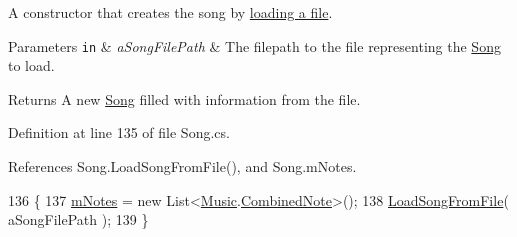 A constructor that creates the song by \hyperlink{group___song_priv_func_ga5c8edd8f7ebeab0d93f5619a644c30f5}{loading a file}. 


\begin{DoxyParams}[1]{Parameters}
\mbox{\tt in}  & {\em a\+Song\+File\+Path} & The filepath to the file representing the \hyperlink{class_song}{Song} to load. \\
\hline
\end{DoxyParams}
\begin{DoxyReturn}{Returns}
A new \hyperlink{class_song}{Song} filled with information from the file. 
\end{DoxyReturn}


Definition at line 135 of file Song.\+cs.



References Song.\+Load\+Song\+From\+File(), and Song.\+m\+Notes.


\begin{DoxyCode}
136     \{
137         \hyperlink{group___song_priv_var_ga674bc904a1f856d485d5fb7fe84bac85}{mNotes} = \textcolor{keyword}{new} List<\hyperlink{class_music}{Music}.\hyperlink{group___music_structs_struct_music_1_1_combined_note}{CombinedNote}>();
138         \hyperlink{group___song_priv_func_ga5c8edd8f7ebeab0d93f5619a644c30f5}{LoadSongFromFile}( aSongFilePath );
139     \}
\end{DoxyCode}
